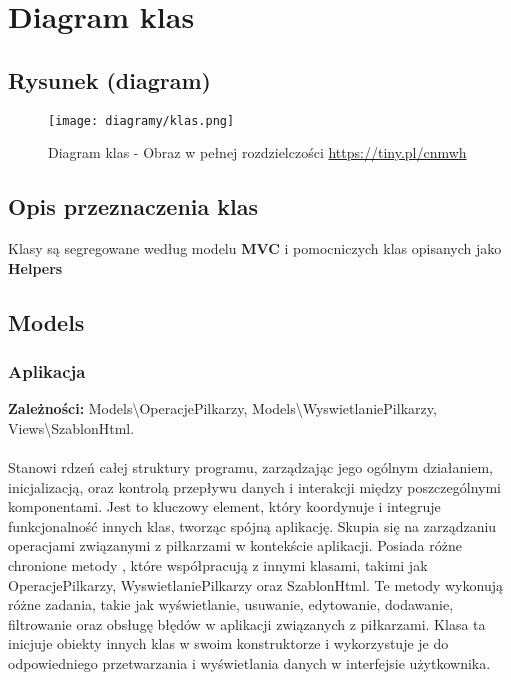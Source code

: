 \section{Diagram klas}

\subsection{Rysunek (diagram)}
\begin{figure}[!htb]
    \centering
    \texttt{[image: diagramy/klas.png]}
    \caption{Diagram klas - Obraz w pełnej rozdzielczości \url{https://tiny.pl/cnmwh}}                
\end{figure}

\subsection{Opis przeznaczenia klas}
    Klasy są segregowane według modelu \textbf{MVC} i pomocniczych klas opisanych jako \textbf{Helpers}

\subsection{Models}
    \subsubsection{Aplikacja}

    \textbf{Zależności: } 
    Models\textbackslash{}OperacjePilkarzy, 
    Models\textbackslash{}WyswietlaniePilkarzy, 
    Views\textbackslash{}SzablonHtml.\\\\
    
    Stanowi rdzeń całej struktury programu, zarządzając jego ogólnym działaniem, inicjalizacją, oraz kontrolą przepływu danych i interakcji między poszczególnymi komponentami. Jest to kluczowy element, który koordynuje i integruje funkcjonalność innych klas, tworząc spójną aplikację.
    Skupia się na zarządzaniu operacjami związanymi z piłkarzami w kontekście aplikacji. Posiada różne chronione metody , które współpracują z innymi klasami, takimi jak OperacjePilkarzy, WyswietlaniePilkarzy oraz SzablonHtml. Te metody wykonują różne zadania, takie jak wyświetlanie, usuwanie, edytowanie, dodawanie, filtrowanie oraz obsługę błędów w aplikacji związanych z piłkarzami. Klasa ta inicjuje obiekty innych klas w swoim konstruktorze i wykorzystuje je do odpowiedniego przetwarzania i wyświetlania danych w interfejsie użytkownika.\\

